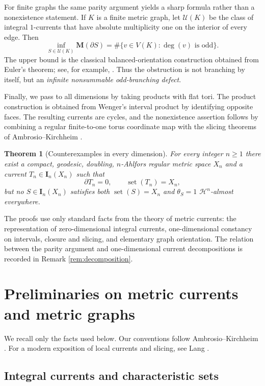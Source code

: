 \documentclass[11pt]{article}
\newtheorem{theorem}{Theorem}[section]
\theoremstyle{remark}
\newcommand{\M}{\mathbf M}
\newcommand{\I}{\mathbf I}
\newcommand{\Hh}{\mathcal H}
\newcommand{\set}{\operatorname{set}}
\begin{document}
For finite graphs the same parity argument yields a sharp formula rather than a nonexistence statement. If $K$ is a finite metric graph, let $\mathscr U(K)$ be the class of integral $1$-currents that have absolute multiplicity one on the interior of every edge. Then
\[
    \inf_{S\in\mathscr U(K)}\M(\partial S)=\#\{v\in V(K):\deg(v)\text{ is odd}\}.
\]
The upper bound is the classical balanced-orientation construction obtained from Euler's theorem; see, for example, \cite{Diestel17}. Thus the obstruction is not branching by itself, but an \emph{infinite nonsummable odd-branching defect}.

Finally, we pass to all dimensions by taking products with flat tori. The product construction is obtained from Wenger's interval product \cite[Section 3.1]{Wenger07} by identifying opposite faces. The resulting currents are cycles, and the nonexistence assertion follows by combining a regular finite-to-one torus coordinate map with the slicing theorems of Ambrosio--Kirchheim \cite[Theorems 5.6--5.7 and 9.7]{AK00}.

\begin{theorem}[Counterexamples in every dimension]\label{thm:all-dim-intro}
For every integer $n\ge 1$ there exist a compact, geodesic, doubling, $n$-Ahlfors regular metric space $X_n$ and a current $T_n\in\I_n(X_n)$ such that
\[
    \partial T_n=0,
    \qquad
    \set(T_n)=X_n,
\]
but no $S\in\I_n(X_n)$ satisfies both $\set(S)=X_n$ and $\theta_S=1$ $\Hh^n$-almost everywhere.
\end{theorem}

The proofs use only standard facts from the theory of metric currents: the representation of zero-dimensional integral currents, one-dimensional constancy on intervals, closure and slicing, and elementary graph orientation. The relation between the parity argument and one-dimensional current decompositions is recorded in Remark \ref{rem:decomposition}.

\section{Preliminaries on metric currents and metric graphs}\label{sec:prelim}

We recall only the facts used below. Our conventions follow Ambrosio--Kirchheim \cite{AK00}. For a modern exposition of local currents and slicing, see Lang \cite{Lang11}.

\subsection{Integral currents and characteristic sets}
\end{document}
